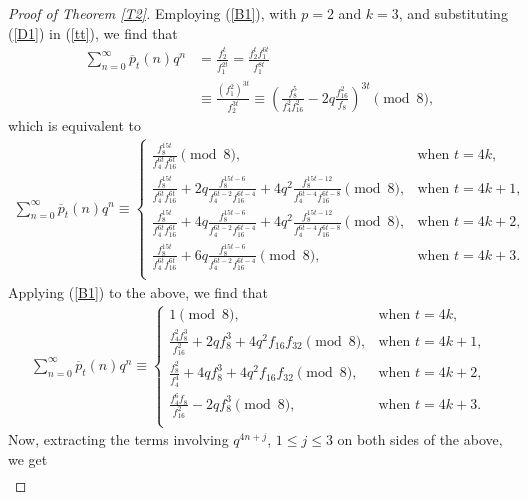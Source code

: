 \documentclass[12pt,reqno,a4paper]{amsart}
\numberwithin{equation}{section}
\begin{document}
\begin{proof}[Proof of Theorem \ref{T2}]
Employing (\ref{B1}), with $p=2$ and $k=3$, and substituting  (\ref{D1}) in (\ref{tt}), we find that
    \begin{align*}
       \sum_{n=0}^\infty\overline{p}_{t}(n)q^n&=\frac{f_2^t}{f_1^{2t}}= \frac{f_2^tf_1^{6t}}{f_1^{8t}}\\&\equiv \frac{(f_1^{2})^{3t}}{f_2^{3t}}\equiv \left(\frac{f_8^5}{f_4^2f_{16}^2}-2q\frac{f_{16}^2}{f_8}\right)^{3t}\pmod{8},
         \end{align*}
 which is equivalent to 
  \begin{align*}
 \sum_{n=0}^\infty\overline{p}_{t}(n)q^n\equiv
 \begin{cases}
 \frac{f_8^{15t}}{f_4^{6t}f_{16}^{6t}}\pmod{8},  &\text{when $t=4k$},\\
      \frac{f_8^{15t}}{f_4^{6t}f_{16}^{6t}}+2q\frac{f_8^{15t-6}}{f_4^{6t-2}f_{16}^{6t-4}}+4q^2\frac{f_8^{15t-12}}{f_4^{6t-4}f_{16}^{6t-8}}\pmod{8}, &\text{when $t=4k+1$},\\
       \frac{f_8^{15t}}{f_4^{6t}f_{16}^{6t}}+4q\frac{f_8^{15t-6}}{f_4^{6t-2}f_{16}^{6t-4}}+4q^2\frac{f_8^{15t-12}}{f_4^{6t-4}f_{16}^{6t-8}}\pmod{8}, &\text{when $t=4k+2$},\\
       \frac{f_8^{15t}}{f_4^{6t}f_{16}^{6t}}+6q\frac{f_8^{15t-6}}{f_4^{6t-2}f_{16}^{6t-4}}\pmod{8}, &\text{when $t=4k+3$}.\\
   \end{cases}
\end{align*}
Applying (\ref{B1}) to the above, we find that
  \begin{align*}
\sum_{n=0}^\infty\overline{p}_{t}(n)q^n\equiv \begin{cases}
 1\pmod{8},  &\text{when $t=4k$},\\
       \frac{f_4^2f_8^3}{f_{16}^2}+2qf_8^3+4q^2f_{16}f_{32} \pmod{8}, &\text{when $t=4k+1$},\\
        \frac{f_8^2}{f_4^4}+4qf_8^3+4q^2f_{16}f_{32} \pmod{8}, &\text{when $t=4k+2$},\\
        \frac{f_4^6f_8}{f_{16}^2}-2qf_8^3\pmod{8}, &\text{when $t=4k+3$}.\\
   \end{cases}
\end{align*}
 Now, extracting the terms involving $q^{4n+j}$, $1\leq j\leq 3$ on both sides of the above, we get
  \begin{align*}

\end{align*}
\end{proof}
\end{document}
